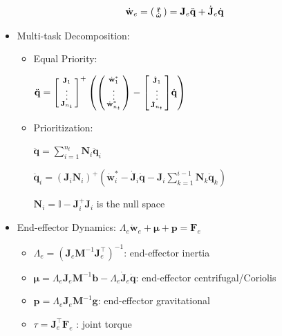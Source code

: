 \documentclass[landscape,a0paper,fontscale=0.285]{baposter} %
\newcommand{\compresslist}{ %
\setlength{\itemsep}{1pt}
\setlength{\parskip}{0pt}
\setlength{\parsep}{0pt}
}
\renewenvironment{bmatrix}{\left[\begin{smallmatrix}}{\end{smallmatrix}\right]}
\renewenvironment{pmatrix}{\left(\begin{smallmatrix}}{\end{smallmatrix}\right)}
\begin{document}
\begin{poster}
{\colorbox[HTML]{CCFFFF}{}
 $$\dot{\mathbf{w}}_e = \begin{pmatrix}\ddot{\mathbf{r}}\\\dot{\boldsymbol{\omega}}\end{pmatrix} = \mathbf{J}_e\ddot{\mathbf{q}} + \dot{\mathbf{J}}_e\dot{\mathbf{q}}$$

\begin{itemize}\compresslist
    \item Multi-task Decomposition:
      \begin{itemize}[label=$\circ$]\compresslist
        \item Equal Priority: 
        
        $\ddot{\mathbf{q}} = \begin{bmatrix}\mathbf{J}_1\\\vdots\\\mathbf{J}_{n_t}\end{bmatrix}^+\left(\begin{pmatrix}\dot{\mathbf{w}}_1^*\\\vdots\\ \dot{\mathbf{w}}^*_{n_t}\end{pmatrix} - \begin{bmatrix}\dot{\mathbf{J}}_1\\\vdots\\\dot{\mathbf{J}}_{n_t}\end{bmatrix}\dot{\mathbf{q}}\right)$
        \item Prioritization: 
        
        $\ddot{\mathbf{q}} = \sum_{i=1}^{n_t}\mathbf{N}_{i}\ddot{\mathbf{q}}_i$ 
        
        $\ddot{\mathbf{q}}_i = (\mathbf{J}_i\mathbf{N}_{i})^+\left(\dot{\mathbf{w}}_i^* - \dot{\mathbf{J}}_i\dot{\mathbf{q}} - \mathbf{J}_i\sum_{k=1}^{i-1}\mathbf{N}_k\ddot{\mathbf{q}}_k\right)$ 
        
        $\mathbf{N}_i = \mathbb{I} - \mathbf{J}_i^+\mathbf{J}_i$ is the null space
      \end{itemize}
    \item End-effector Dynamics: $\Lambda_e \dot{\mathbf{w}}_e + \boldsymbol{\mu} + \mathbf{p} = \mathbf{F}_e$
      \begin{itemize}[label=$\circ$]\compresslist
        \item $\Lambda_e = (\mathbf{J}_e\mathbf{M}^{-1}\mathbf{J}_e^\top)^{-1}$: end-effector inertia
        \item $\boldsymbol{\mu} = \Lambda_e\mathbf{J}_e\mathbf{M}^{-1}\mathbf{b} - \Lambda_e \dot{\mathbf{J}}_e\dot{\mathbf{q}}$: end-effector centrifugal/Coriolis
        \item $\mathbf{p} = \Lambda_e \mathbf{J}_e\mathbf{M}^{-1}\mathbf{g}$: end-effector gravitational
        \item $\tau = \mathbf{J}_e^\top \mathbf{F}_e$ : joint torque 
      \end{itemize}


\end{itemize}}
\end{poster}
\end{document}
